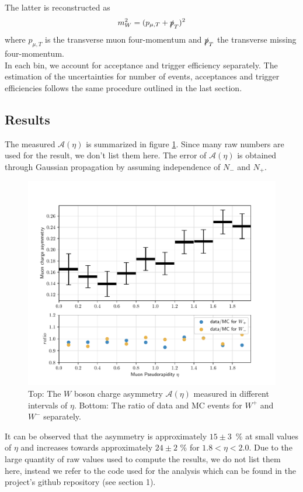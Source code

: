 \documentclass[11pt,a4paper]{article}
\begin{document}
The latter is reconstructed as  
\begin{equation}
	m_W ^2 = (p_{\mu,T} + \slashed{p}_{T})^2
\end{equation}
where $p_{\mu,T}$ is the transverse muon four-momentum and $ \slashed{p}_{T}$ the transverse missing four-momentum.
\\
In each bin, we account for acceptance and trigger efficiency separately. The estimation of the uncertainties for number of events, acceptances and trigger efficiencies follows the same procedure outlined in the last section. 

\subsection{Results}	
The measured $\mathcal{A}(\eta)$ is summarized in figure \ref{fig:asymm}. Since many raw numbers are used for the result, we don't list them here. The error of $\mathcal{A}(\eta)$ is obtained through Gaussian propagation by assuming independence of $N_-$ and $N_+$. 
\begin{figure}[!htb]
	\begin{center}
	\includegraphics[scale=0.7]{fig/asymmetry.pdf}
	\end{center}
	\caption{Top: The $W$ boson charge asymmetry $\mathcal{A}(\eta)$ measured in different intervals of $\eta$. Bottom: The ratio of data and MC events for $W^+$ and $W^-$ separately. }
	\label{fig:asymm}
\end{figure}
It can be observed that the asymmetry is approximately $15 \pm 3$ \% at small values of $\eta$ and increases towards approximately $24 \pm 2$ \% for $1.8 < \eta < 2.0$. Due to the large quantity of raw values used to compute the results, we do not list them here, instead we refer to the code used for the analysis which can be found in the project's github repository (see section 1).
\end{document}

